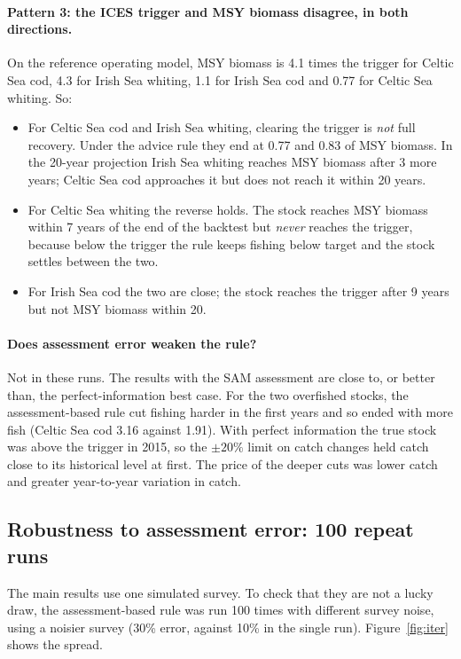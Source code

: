 \documentclass[11pt,a4paper]{article}
\begin{document}
\paragraph{Pattern 3: the ICES trigger and MSY biomass disagree, in both directions.}
On the reference operating model, MSY biomass is 4.1 times the trigger for
Celtic Sea cod, 4.3 for Irish Sea whiting, 1.1 for Irish Sea cod and 0.77
for Celtic Sea whiting. So:
\begin{itemize}
\item For Celtic Sea cod and Irish Sea whiting, clearing the trigger is
\emph{not} full recovery. Under the advice rule they end at 0.77 and 0.83
of MSY biomass. In the 20-year projection Irish Sea whiting reaches MSY
biomass after 3 more years; Celtic Sea cod approaches it but does not
reach it within 20 years.
\item For Celtic Sea whiting the reverse holds. The stock reaches MSY
biomass within 7 years of the end of the backtest but \emph{never} reaches the
trigger, because below the trigger the rule keeps fishing below target
and the stock settles between the two.
\item For Irish Sea cod the two are close; the stock reaches the trigger
after 9 years but not MSY biomass within 20.
\end{itemize}

\paragraph{Does assessment error weaken the rule?} Not in these runs. The
results with the SAM assessment are close to, or better than, the
perfect-information best case. For the two overfished stocks, the
assessment-based rule cut fishing harder in the first years and so ended
with more fish (Celtic Sea cod 3.16 against 1.91). With perfect
information the true stock was above the trigger in 2015, so the
$\pm20\%$ limit on catch changes held catch close to its historical level
at first. The price of the deeper cuts was lower catch and greater
year-to-year variation in catch.

\subsection{Robustness to assessment error: 100 repeat runs}

The main results use one simulated survey. To check that they are not a
lucky draw, the assessment-based rule was run 100 times with different
survey noise, using a noisier survey (30\% error, against 10\% in the
single run). Figure~\ref{fig:iter} shows the spread.
\end{document}
